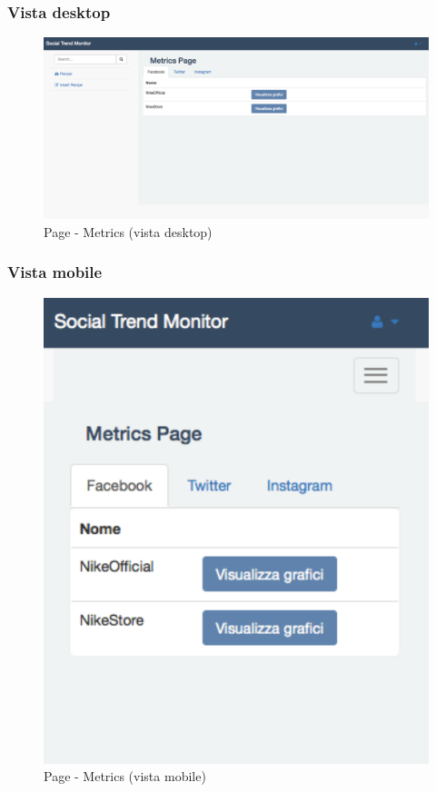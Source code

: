 		\subsubsection{Vista desktop} %
		\begin{figure}[htbp]
			\centering
			\centerline{\includegraphics[scale=0.4]{./images/mockup/metrics_vd.pdf}}
			\caption{Page - Metrics (vista desktop)}
		\end{figure}

		\subsubsection{Vista mobile} %
		\begin{figure}[htbp]
			\centering
			\centerline{\includegraphics[scale=0.5]{./images/mockup/metrics_vm.pdf}}
			\caption{Page - Metrics (vista mobile)}
		\end{figure}

